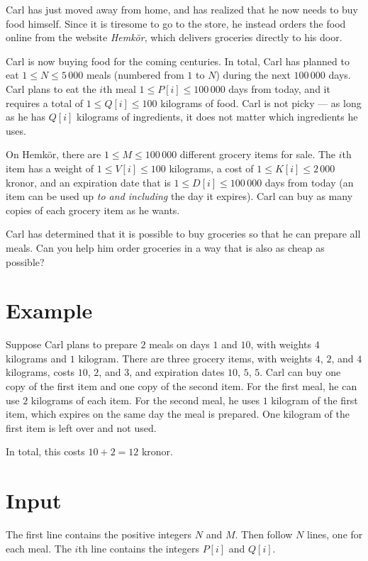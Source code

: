 \def\version{1}
Carl has just moved away from home, and has realized that he now needs to buy food himself.
Since it is tiresome to go to the store, he instead orders the food online from the website \emph{Hemkör}, which delivers groceries directly to his door.

Carl is now buying food for the coming centuries.
In total, Carl has planned to eat $1 \le N \le 5\,000$ meals (numbered from $1$ to $N$) during the next $100\,000$ days.
Carl plans to eat the $i$th meal $1 \le P[i] \le 100\,000$ days from today, and it requires a total of $1 \le Q[i] \le 100$ kilograms of food.
Carl is not picky --- as long as he has $Q[i]$ kilograms of ingredients, it does not matter which ingredients he uses.

On Hemkör, there are $1 \le M \le 100\,000$ different grocery items for sale.
The $i$th item has a weight of $1 \le V[i] \le 100$ kilograms, a cost of $1 \le K[i] \le 2\,000$ kronor, and an expiration date that is $1 \le D[i] \le 100\,000$ days from today (an item can be used up \emph{to and including} the day it expires).
Carl can buy as many copies of each grocery item as he wants.

Carl has determined that it is possible to buy groceries so that he can prepare all meals.
Can you help him order groceries in a way that is also as cheap as possible?

\section*{Example}
Suppose Carl plans to prepare $2$ meals on days $1$ and $10$, with weights $4$ kilograms and $1$ kilogram.
There are three grocery items, with weights $4$, $2$, and $4$ kilograms, costs $10$, $2$, and $3$, and expiration dates $10$, $5$, $5$.
Carl can buy one copy of the first item and one copy of the second item.
For the first meal, he can use $2$ kilograms of each item.
For the second meal, he uses $1$ kilogram of the first item, which expires on the same day the meal is prepared.
One kilogram of the first item is left over and not used.

In total, this costs $10 + 2 = 12$ kronor.

\section*{Input}
The first line contains the positive integers $N$ and $M$.
Then follow $N$ lines, one for each meal.
The $i$th line contains the integers $P[i]$ and $Q[i]$.

